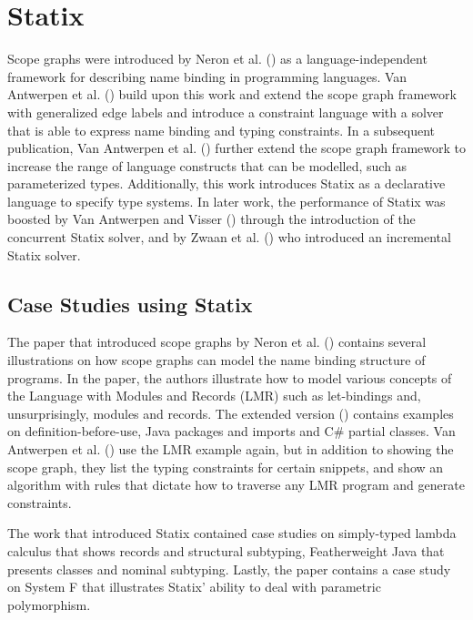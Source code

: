   \section{Statix}

    Scope graphs were introduced by Neron et al. (\citeyear{Neron2015}) as a language-independent framework for describing name binding in programming languages. Van Antwerpen et al. (\citeyear{AntwerpenNTVW16}) build upon this work and extend the scope graph framework with generalized edge labels and introduce a constraint language with a solver that is able to express name binding and typing constraints. In a subsequent publication, Van Antwerpen et al. (\citeyear{VanAntwerpen2018}) further extend the scope graph framework to increase the range of language constructs that can be modelled, such as parameterized types. Additionally, this work introduces Statix as a declarative language to specify type systems. In later work, the performance of Statix was boosted by Van Antwerpen and Visser (\citeyear{AntwerpenV21}) through the introduction of the concurrent Statix solver, and by Zwaan et al. (\citeyear{ZwaanAV22}) who introduced an incremental Statix solver.

    \subsection{Case Studies using Statix}

      The paper that introduced scope graphs by Neron et al. (\citeyear{Neron2015}) contains several illustrations on how scope graphs can model the name binding structure of programs. In the paper, the authors illustrate how to model various concepts of the Language with Modules and Records (LMR) such as let-bindings and, unsurprisingly, modules and records. The extended version (\citeyear{TUD-SERG-2015-001}) contains examples on definition-before-use, Java packages and imports and C\# partial classes. Van Antwerpen et al. (\citeyear{AntwerpenNTVW16}) use the LMR example again, but in addition to showing the scope graph, they list the typing constraints for certain snippets, and show an algorithm with rules that dictate how to traverse any LMR program and generate constraints.

      The work that introduced Statix \autocite{VanAntwerpen2018} contained case studies on simply-typed lambda calculus that shows records and structural subtyping, Featherweight Java that presents classes and nominal subtyping. Lastly, the paper contains a case study on System F that illustrates Statix' ability to deal with parametric polymorphism.

